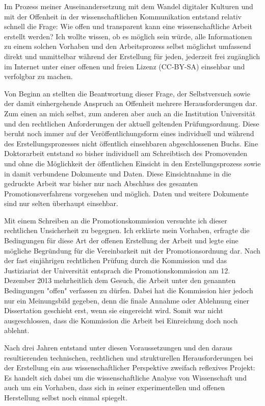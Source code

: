 Im Prozess meiner Auseinandersetzung mit dem Wandel digitaler Kulturen und mit der Offenheit in der wissenschaftlichen Kommunikation entstand relativ schnell die Frage: Wie offen und transparent kann eine wissenschaftliche Arbeit erstellt werden? Ich wollte wissen, ob es möglich sein würde, alle Informationen zu einem solchen Vorhaben und den Arbeitsprozess selbst möglichst umfassend direkt und unmittelbar während der Erstellung für jeden, jederzeit frei zugänglich im Internet unter einer offenen und freien Lizenz (CC-BY-SA) einsehbar und verfolgbar zu machen.

Von Beginn an stellten die Beantwortung dieser Frage, der Selbstversuch sowie der damit einhergehende Anspruch an Offenheit mehrere Herausforderungen dar. Zum einen an mich selbst, zum anderen aber auch an die Institution Universität und den rechtlichen Anforderungen der aktuell geltenden Prüfungsordnung. Diese beruht noch immer auf der Veröffentlichungsform eines individuell und während des Erstellungsprozesses nicht öffentlich einsehbaren abgeschlossenen Buchs. Eine Doktorarbeit entstand so bisher individuell am Schreibtisch des Promovenden und ohne die Möglichkeit der öffentlichen Einsicht in den Erstellungsprozess sowie in damit verbundene Dokumente und Daten. Diese Einsichtnahme in die gedruckte Arbeit war bisher nur nach Abschluss des gesamten Promotionsverfahrens vorgesehen und möglich. Daten und weitere Dokumente sind nur selten überhaupt einsehbar.

Mit einem Schreiben an die Promotionskommission versuchte ich dieser rechtlichen Unsicherheit zu begegnen. Ich erklärte mein Vorhaben, erfragte die Bedingungen für diese Art der offenen Erstellung der Arbeit und legte eine mögliche Begründung für die Vereinbarkeit mit der Promotionsordnung dar. Nach der fast einjährigen rechtlichen Prüfung durch die Kommission und das Justiziariat der Universität entsprach die Promotionskommission am 12. Dezember 2013 mehrheitlich dem Gesuch, die Arbeit unter den genannten Bedingungen "offen" verfassen zu dürfen. Dabei hat die Kommission hier jedoch nur ein Meinungsbild gegeben, denn die finale Annahme oder Ablehnung einer Dissertation geschieht erst, wenn sie eingereicht wird. Somit war nicht ausgeschlossen, dass die Kommission die Arbeit bei Einreichung doch noch ablehnt.

Nach drei Jahren entstand unter diesen Voraussetzungen und den daraus resultierenden technischen, rechtlichen und strukturellen Herausforderungen bei der Erstellung ein aus wissenschaftlicher Perspektive zweifach reflexives Projekt: Es handelt sich dabei um die wissenschaftliche Analyse von Wissenschaft und auch um ein Vorhaben, dass sich in seiner experimentellen und offenen Herstellung selbst noch einmal spiegelt.

